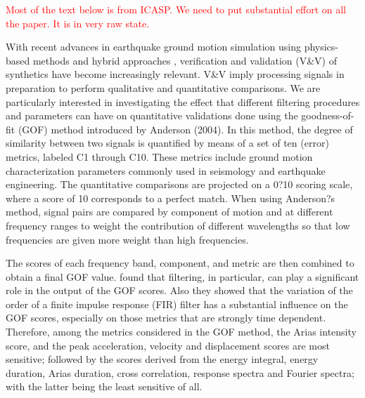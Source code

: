 
\introduction

\textcolor{red}{Most of the text below is from ICASP. We need to put substantial effort on all the paper. It is in very raw state.}

With recent advances in earthquake ground motion simulation using physics-based methods and hybrid approaches \citep[e.g.,][]{Bielak_2010_GJI, Graves_2010}, verification and validation (V\&V) of synthetics have become increasingly relevant. V\&V imply processing signals in preparation to perform qualitative and quantitative comparisons. We are particularly interested in investigating the effect that different filtering procedures and parameters can have on quantitative validations done using the goodness-of-fit (GOF) method introduced by Anderson (2004). In this method, the degree of similarity between two signals is quantified by means of a set of ten (error) metrics, labeled C1 through C10. These metrics include ground motion characterization parameters commonly used in seismology and earthquake engineering. The quantitative comparisons are projected on a 0?10 scoring scale, where a score of 10 corresponds to a perfect match. When using Anderson?s method, signal pairs are compared by component of motion and at different frequency ranges to weight the contribution of different wavelengths so that low frequencies are given more weight than high frequencies.

The scores of each frequency band, component, and metric are then combined to obtain a final GOF value. \citet{Khoshnevis_2015} found that filtering, in particular, can play a significant role in the output of the GOF scores. Also they showed that the variation of the order of a finite impulse response (FIR) filter has a substantial influence on the GOF scores, especially on those metrics that are strongly time dependent. Therefore, among the metrics considered in the GOF method, the Arias intensity score, and the peak acceleration, velocity and displacement scores are most sensitive; followed by the scores derived from the energy integral, energy duration, Arias duration, cross correlation, response spectra and Fourier spectra; with the latter being the least sensitive of all.

